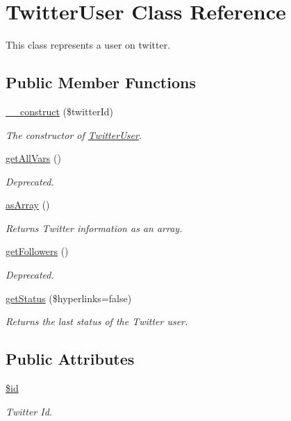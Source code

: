 \hypertarget{class_twitter_user}{
\section{TwitterUser Class Reference}
\label{class_twitter_user}
}


This class represents a user on twitter.  


\subsection*{Public Member Functions}
\begin{DoxyCompactItemize}
\item 
\hyperlink{class_twitter_user_aac09b350e318425625ba5766fdd28118}{\_\-\_\-construct} (\$twitterId)
\begin{DoxyCompactList}\small\item\em The constructor of \hyperlink{class_twitter_user}{TwitterUser}. \end{DoxyCompactList}\item 
\hyperlink{class_twitter_user_a3f9ce8a4f4440b619615becf76b43895}{getAllVars} ()
\begin{DoxyCompactList}\small\item\em Deprecated. \end{DoxyCompactList}\item 
\hyperlink{class_twitter_user_a0badd8e7ffdf4e7c30f4954d782efc21}{asArray} ()
\begin{DoxyCompactList}\small\item\em Returns Twitter information as an array. \end{DoxyCompactList}\item 
\hyperlink{class_twitter_user_ac1171d93ebf6f48e8440b9e8575252df}{getFollowers} ()
\begin{DoxyCompactList}\small\item\em Deprecated. \end{DoxyCompactList}\item 
\hyperlink{class_twitter_user_ac9d80058de5952727ecf7f58448d266b}{getStatus} (\$hyperlinks=false)
\begin{DoxyCompactList}\small\item\em Returns the last status of the Twitter user. \end{DoxyCompactList}\end{DoxyCompactItemize}
\subsection*{Public Attributes}
\begin{DoxyCompactItemize}
\item 
\hyperlink{class_twitter_user_a4096acd6dd8fdc48d8d3523807fb3bef}{\$id}
\begin{DoxyCompactList}\small\item\em Twitter Id. \end{DoxyCompactList}\end{DoxyCompactItemize}


